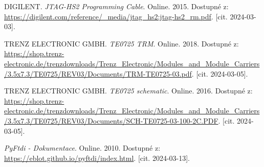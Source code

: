 \begin{thebibliography}{99}
DIGILENT. \textit{JTAG-HS2 Programming Cable}. Online. 2015. Dostupné z: \url{https://digilent.com/reference/\_media/jtag\_hs2:jtag-hs2\_rm.pdf}. [cit. 2024-03-03].

TRENZ ELECTRONIC GMBH. \textit{TE0725 TRM}. Online. 2018. Dostupné z: \url{https://shop.trenz-electronic.de/trenzdownloads/Trenz\_Electronic/Modules\_and\_Module\_Carriers/3.5x7.3/TE0725/REV03/Documents/TRM-TE0725-03.pdf}. [cit. 2024-03-05].

TRENZ ELECTRONIC GMBH. \textit{TE0725 schematic}. Online. 2016. Dostupné z: \url{https://shop.trenz-electronic.de/trenzdownloads/Trenz\_Electronic/Modules\_and\_Module\_Carriers/3.5x7.3/TE0725/REV03/Documents/SCH-TE0725-03-100-2C.PDF}. [cit. 2024-03-05].

\textit{PyFtdi - Dokumentace}. Online. 2010. Dostupné z: \url{https://eblot.github.io/pyftdi/index.html}. [cit. 2024-03-13].

\end{thebibliography}


%
%
%
